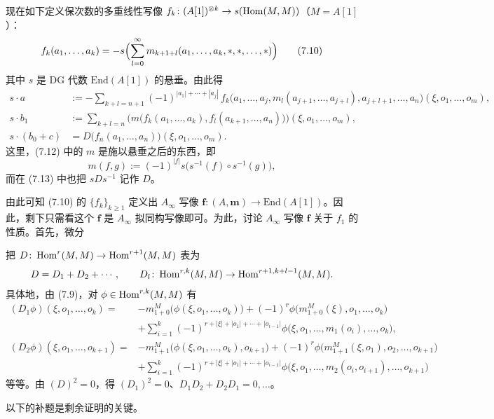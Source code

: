 现在如下定义保次数的多重线性写像 $f_{k}\colon(A[1])^{\otimes k}\to s(\operatorname{Hom}(M,M))$（$M=A[1]$）：
\begin{equation}
  f_{k}(a_{1},\dots,a_{k})=-s\Bigl(\sum_{l=0}^{\infty}m_{k+1+l}(a_{1},\dots,a_{k},*,*,\dots,*)\Bigr) \tag{7.10}
\end{equation}
其中 $s$ 是 DG 代数 $\mathrm{End}(A[1])$ 的悬垂。由此得
\begin{align}
  s\cdot a&:=-\sum_{k+l=n+1}(-1)^{|a_{1}|+\cdots+|a_{j}|}\,f_{k}\bigl(a_{1},\dots,a_{j},m_{l}(a_{j+1},\dots,a_{j+l}),a_{j+l+1},\dots,a_{n}\bigr)(\xi,o_{1},\dots,o_{m}), \tag{7.11}\\
  s\cdot b_{1}&:=\sum_{k+l=n}\bigl(m\bigl(f_{k}(a_{1},\dots,a_{k}),f_{l}(a_{k+1},\dots,a_{n})\bigr)\bigr)(\xi,o_{1},\dots,o_{m}), \tag{7.12}\\
  s\cdot(b_{0}+c)&=D\bigl(f_{n}(a_{1},\dots,a_{n})\bigr)(\xi,o_{1},\dots,o_{m}). \tag{7.13}
\end{align}
这里，(7.12) 中的 $m$ 是施以悬垂之后的东西，即
\[
  m(f,g):=(-1)^{|f|}s\bigl(s^{-1}(f)\circ s^{-1}(g)\bigr),
\]
而在 (7.13) 中也把 $sDs^{-1}$ 记作 $D$。

由此可知 (7.10) 的 $\{f_{k}\}_{k\ge1}$ 定义出 $A_\infty$ 写像 $\mathbf f\colon(A,\mathbf m)\to\mathrm{End}(A[1])$。因此，剩下只需看这个 $\mathbf f$ 是 $A_\infty$ 拟同构写像即可。为此，讨论 $A_\infty$ 写像 $\mathbf f$ 关于 $f_{1}$ 的性质。首先，微分


把 $D\colon\operatorname{Hom}^{r}(M,M)\to\operatorname{Hom}^{r+1}(M,M)$ 表为
\[
  D=D_{1}+D_{2}+\cdots,\qquad D_{l}\colon\operatorname{Hom}^{r,k}(M,M)\to\operatorname{Hom}^{r+1,k+l-1}(M,M).
\]
具体地，由 (7.9)，对 $\phi\in\operatorname{Hom}^{r,k}(M,M)$ 有
\begin{align*}
  (D_{1}\phi)(\xi,o_{1},\dots,o_{k})={}&-m_{1+0}^{M}\bigl(\phi(\xi,o_{1},\dots,o_{k})\bigr)+(-1)^{r}\phi\bigl(m_{1+0}^{M}(\xi),o_{1},\dots,o_{k}\bigr)\\
  &+\sum_{i=1}^{k}(-1)^{r+|\xi|+|o_{1}|+\cdots+|o_{i-1}|}\phi\bigl(\xi,o_{1},\dots,m_{1}(o_{i}),\dots,o_{k}\bigr),\\
  (D_{2}\phi)(\xi,o_{1},\dots,o_{k+1})={}&-m_{1+1}^{M}\bigl(\phi(\xi,o_{1},\dots,o_{k}),o_{k+1}\bigr)+(-1)^{r}\phi\bigl(m_{1+1}^{M}(\xi,o_{1}),o_{2},\dots,o_{k+1}\bigr)\\
  &+\sum_{i=1}^{k}(-1)^{r+|\xi|+|o_{1}|+\cdots+|o_{i-1}|}\phi\bigl(\xi,o_{1},\dots,m_{2}(o_{i},o_{i+1}),\dots,o_{k+1}\bigr)
\end{align*}
等等。由 $(D)^{2}=0$，得 $(D_{1})^{2}=0$、$D_{1}D_{2}+D_{2}D_{1}=0,\dots$。

以下的补题是剩余证明的关键。

